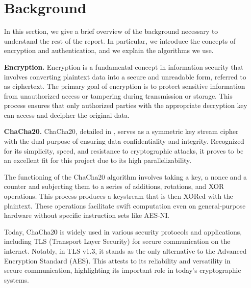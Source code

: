 \documentclass[letterpaper]{article}
\newcommand{\mypar}[1]{{\bf #1.}}
\begin{document}
\section{Background}\label{sec:background}
In this section, we give a brief overview of the background necessary to understand the rest of the report.
In particular, we introduce the concepts of encryption and authentication, and we explain the algorithms we use.

\mypar{Encryption}
Encryption is a fundamental concept in information security that involves converting plaintext data into a secure and unreadable form, referred to as ciphertext. The primary goal of encryption is to protect sensitive information from unauthorized access or tampering during transmission or storage. This process ensures that only authorized parties with the appropriate decryption key can access and decipher the original data.

\mypar{ChaCha20}
ChaCha20, detailed in \cite{chacha20}, serves as a symmetric key stream cipher with the dual purpose of ensuring data confidentiality and integrity. Recognized for its simplicity, speed, and resistance to cryptographic attacks, it proves to be an excellent fit for this project due to its high parallelizability.

The functioning of the ChaCha20 algorithm involves taking a key, a nonce and a counter and subjecting them to a series of additions, rotations, and XOR operations. This process produces a keystream that is then XORed with the plaintext. These operations facilitate swift computation even on general-purpose hardware without specific instruction sets like AES-NI.

Today, ChaCha20 is widely used in various security protocols and applications, including TLS (Transport Layer Security) for secure communication on the internet. Notably, in TLS v1.3, it stands as the only alternative to the Advanced Encryption Standard (AES). This attests to its reliability and versatility in secure communication, highlighting its important role in today's cryptographic systems.
\end{document}
